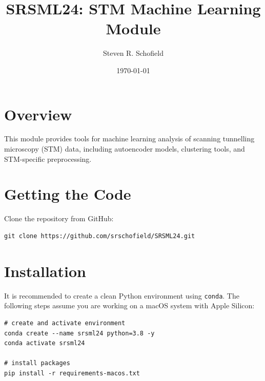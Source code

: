 \documentclass[11pt]{article}
\title{SRSML24: STM Machine Learning Module}
\author{Steven R. Schofield}
\date{\today}
\begin{document}
\maketitle

\section*{Overview}
This module provides tools for machine learning analysis of scanning tunnelling microscopy (STM) data, including autoencoder models, clustering tools, and STM-specific preprocessing.

\section*{Getting the Code}
Clone the repository from GitHub:

\begin{verbatim}
git clone https://github.com/srschofield/SRSML24.git
\end{verbatim}

\section*{Installation}
It is recommended to create a clean Python environment using \texttt{conda}. The following steps assume you are working on a macOS system with Apple Silicon:

\begin{verbatim}
# create and activate environment
conda create --name srsml24 python=3.8 -y
conda activate srsml24

# install packages
pip install -r requirements-macos.txt
\end{verbatim}
\end{document}
